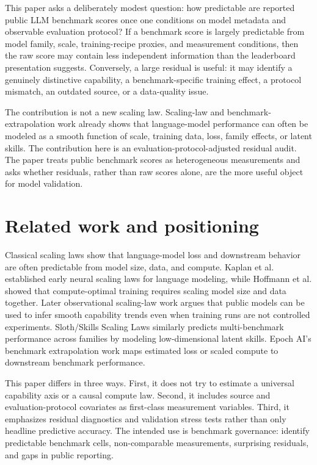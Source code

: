 \documentclass[11pt]{article}
\begin{document}
This paper asks a deliberately modest question: how predictable are reported public LLM benchmark scores once one conditions on model metadata and observable evaluation protocol?  If a benchmark score is largely predictable from model family, scale, training-recipe proxies, and measurement conditions, then the raw score may contain less independent information than the leaderboard presentation suggests.  Conversely, a large residual is useful: it may identify a genuinely distinctive capability, a benchmark-specific training effect, a protocol mismatch, an outdated source, or a data-quality issue.

The contribution is not a new scaling law.  Scaling-law and benchmark-extrapolation work already shows that language-model performance can often be modeled as a smooth function of scale, training data, loss, family effects, or latent skills.  The contribution here is an evaluation-protocol-adjusted residual audit.  The paper treats public benchmark scores as heterogeneous measurements and asks whether residuals, rather than raw scores alone, are the more useful object for model validation.

\section{Related work and positioning}
Classical scaling laws show that language-model loss and downstream behavior are often predictable from model size, data, and compute.  Kaplan et al. established early neural scaling laws for language modeling, while Hoffmann et al. showed that compute-optimal training requires scaling model size and data together.  Later observational scaling-law work argues that public models can be used to infer smooth capability trends even when training runs are not controlled experiments.  Sloth/Skills Scaling Laws similarly predicts multi-benchmark performance across families by modeling low-dimensional latent skills.  Epoch AI's benchmark extrapolation work maps estimated loss or scaled compute to downstream benchmark performance.

This paper differs in three ways.  First, it does not try to estimate a universal capability axis or a causal compute law.  Second, it includes source and evaluation-protocol covariates as first-class measurement variables.  Third, it emphasizes residual diagnostics and validation stress tests rather than only headline predictive accuracy.  The intended use is benchmark governance: identify predictable benchmark cells, non-comparable measurements, surprising residuals, and gaps in public reporting.
\end{document}
